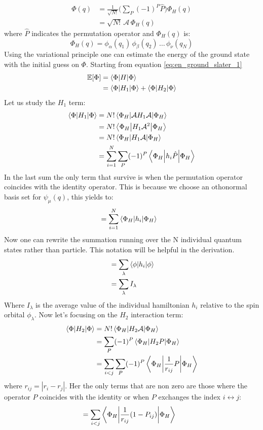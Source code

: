 \begin{align*}
    \Phi(q) &= \frac{1}{\sqrt{N!}}\bigg(\sum_P (-1)^P \hat{P} \bigg) \Phi_H(q) \\
     &= \sqrt{N!} \, \mathcal{A} \, \Phi_H(q)
\end{align*}
where $\hat{P}$ indicates the permutation operator and $\Phi_H(q)$ is:
\begin{equation*}
    \Phi_H(q) = \phi_\alpha(q_1) \, \phi_\beta(q_2) \, \dots \, \phi_\nu(q_N)  
\end{equation*}
Using the variational principle one can estimate the energy of the ground state with the initial guess on $\Phi$.
Starting from equation \ref{eq:en_ground_slater_1}
\begin{align*}
    \mathbb{E}[\Phi] &= \bracketOP{\Phi}{\Phi}{H} \\
    &= \bracketOP{\Phi}{\Phi}{H_1} + \bracketOP{\Phi}{\Phi}{H_2}
\end{align*}
Let us study the $H_1$ term: 
\begin{align*}
    \bracketOP{\Phi}{\Phi}{H_1} &= N! \bracketOP{\Phi_H}{\Phi_H}{\mathcal{A}H_1\mathcal{A}} \\
    &= N! \bracketOP{\Phi_H}{\Phi_H}{H_1\mathcal{A}^2} \\
    &= N! \bracketOP{\Phi_H}{\Phi_H}{H_1\mathcal{A}} \\
    &= \sum_{i=1}^N \sum_P (-1)^P \bracketOP{\Phi_H}{\Phi_H}{h_i\hat{P}} \\
\end{align*}
In the last sum the only term that survive is when the permutation operator coincides with the identity operator. This is because we choose an othonormal basis set for $\psi_{\mu}(q)$, this yields to: 
\begin{align*}
    &= \sum_{i=1}^N  \bracketOP{\Phi_H}{\Phi_H}{h_i}
\end{align*}
Now one can rewrite the summation running over the N individual quantum states rather than particle. 
This notation will be helpful in the derivation. 
\begin{align*}
    &= \sum_{\lambda} \bracketOP{\phi}{\phi}{h_i}\\
    &= \sum_{\lambda} I_\lambda
\end{align*}
Where $I_{\lambda}$ is the average value of the individual hamiltonian $h_i$ relative to the spin orbital $\phi_{\lambda}$.
Now let's focusing on the $H_2$ interaction term: 
\begin{align*}
    \bracketOP{\Phi}{\Phi}{H_2} &= N! \bracketOP{\Phi_H}{\Phi_H}{H_2 \mathcal{A}} \\
    &= \sum_P (-1)^P  \bracketOP{\Phi_H}{\Phi_H}{H_2 P} \\
    &= \sum_{i<j} \sum_P (-1)^P  \bracketOP{\Phi_H}{\Phi_H}{\frac{1}{r_{ij}} P}
\end{align*}
where $r_{ij}=|r_i -r_j|$. Her the only terms that are non zero are those where the operator $P$ coincides with the identity or when $P$ exchanges the index $i \leftrightarrow j$:   
\begin{align*}
    &= \sum_{i<j} \bracketOP{\Phi_H}{\Phi_H}{\frac{1}{r_{ij}}(1-P_{ij})}
\end{align*}



